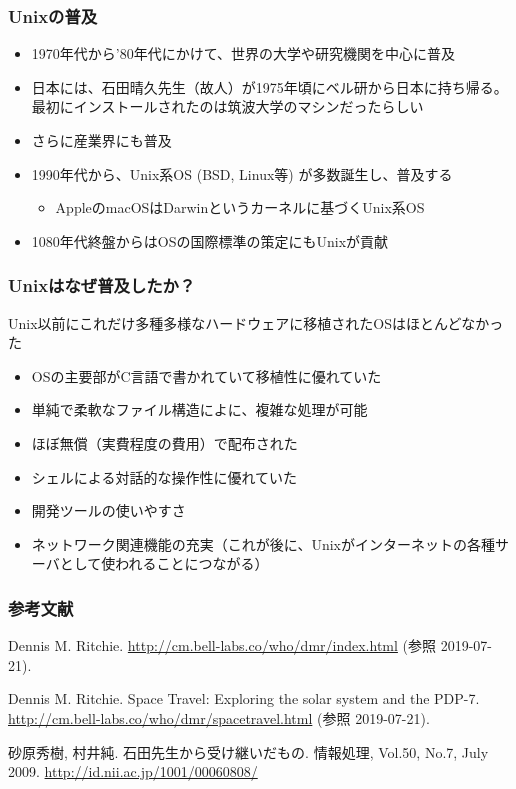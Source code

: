 \documentclass[dvipdfmx]{beamer}
\begin{document}
\begin{frame}
    \frametitle{Unixの普及}
    \begin{itemize}
        \item 1970年代から'80年代にかけて、世界の大学や研究機関を中心に普及
        \item 日本には、石田晴久先生（故人）が1975年頃にベル研から日本に持ち帰る。最初にインストールされたのは筑波大学のマシンだったらしい \cite{sunahara-murai}
        \item さらに産業界にも普及
        \item 1990年代から、Unix系OS (BSD, Linux等) が多数誕生し、普及する
        \begin{itemize}
            \item AppleのmacOSはDarwinというカーネルに基づくUnix系OS
        \end{itemize}
        \item 1080年代終盤からはOSの国際標準の策定にもUnixが貢献
    \end{itemize}
\end{frame}

\begin{frame}
    \frametitle{Unixはなぜ普及したか？}

    \begin{block}{Unix以前にこれだけ多種多様なハードウェアに移植されたOSはほとんどなかった}
        \begin{itemize}
            \item OSの主要部がC言語で書かれていて移植性に優れていた
            \item 単純で柔軟なファイル構造によに、複雑な処理が可能
            \item ほぼ無償（実費程度の費用）で配布された
            \item シェルによる対話的な操作性に優れていた
            \item 開発ツールの使いやすさ
            \item ネットワーク関連機能の充実（これが後に、Unixがインターネットの各種サーバとして使われることにつながる）
        \end{itemize}
    \end{block}
\end{frame}

\begin{frame}[allowframebreaks]
    \frametitle{参考文献}
    \begin{thebibliography}{99}
         Dennis M. Ritchie. \url{http://cm.bell-labs.co/who/dmr/index.html} (参照 2019-07-21).

         Dennis M. Ritchie. Space Travel: Exploring the solar system and the PDP-7. \url{http://cm.bell-labs.co/who/dmr/spacetravel.html} (参照 2019-07-21).
        
         砂原秀樹, 村井純. 石田先生から受け継いだもの. 情報処理, Vol.50, No.7, July 2009. \url{http://id.nii.ac.jp/1001/00060808/}

        
    \end{thebibliography}    
\end{frame}
\end{document}
